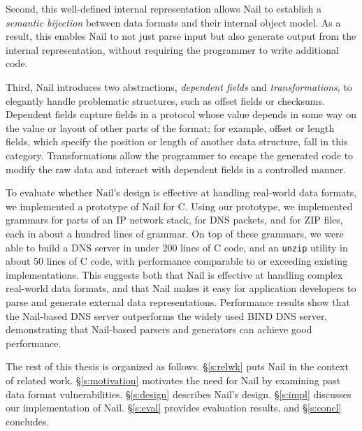 Second, this well-defined internal representation allows Nail to
establish a {\em semantic bijection} between data formats and their
internal object model.  As a result, this enables Nail to not just
parse input but also generate output from the internal representation,
without requiring the programmer to write additional code.




Third, Nail introduces two abstractions, \emph{dependent fields} and
\emph{transformations}, to elegantly handle problematic structures,
such as offset fields or checksums.  Dependent fields capture fields
in a protocol whose value depends in some way on the value or layout
of other parts of the format; for example, offset or length fields,
which specify the position or length of another data structure, fall
in this category.  Transformations allow the programmer to escape the
generated code to modify the raw data and interact with dependent fields
in a controlled manner.

To evaluate whether Nail's design is effective at handling real-world data
formats, we implemented a prototype of Nail for C\@. Using our prototype, we
implemented grammars for parts of an IP network stack, for DNS packets,
and for ZIP files, each in about a hundred lines of grammar. On top of these
grammars, we were able to build a DNS server in under 200 lines of C code, and
an {\tt unzip} utility in about 50 lines of C code, with performance comparable
to or exceeding existing implementations. This suggests both that Nail is
effective at handling complex real-world data formats, and that Nail makes it
easy for application developers to parse and generate external data
representations. Performance results show that the Nail-based DNS server
outperforms the widely used BIND DNS server, demonstrating that Nail-based
parsers and generators can achieve good performance.

The rest of this thesis is organized as follows.  \S\ref{s:relwk}
puts Nail in the context of related work.
\S\ref{s:motivation} motivates the need for Nail by examining
past data format vulnerabilities.
\S\ref{s:design} describes
Nail's design.  \S\ref{s:impl} discusses our implementation
of Nail.  \S\ref{s:eval} provides evaluation results, and
\S\ref{s:concl} concludes.

